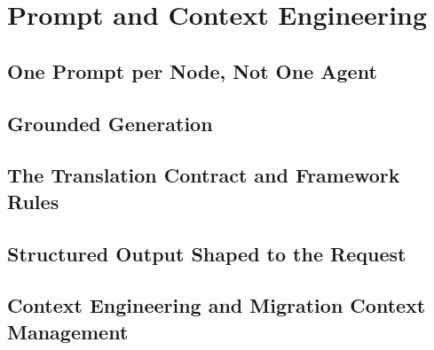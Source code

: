 \chapter{Prompt and Context Engineering}
\label{chap:prompting}

\section{One Prompt per Node, Not One Agent}
\label{sec:prompting-per-node}


\section{Grounded Generation}
\label{sec:prompting-grounding}


\section{The Translation Contract and Framework Rules}
\label{sec:prompting-contract}


\section{Structured Output Shaped to the Request}
\label{sec:prompting-structured}


\section{Context Engineering and Migration Context Management}
\label{sec:prompting-context}

